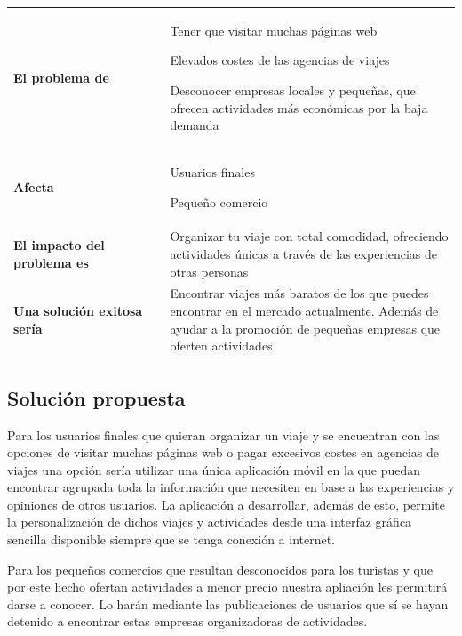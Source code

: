 \documentclass[11pt]{article}
\begin{document}
\begin{table}[H]
  \centering
  \begin{tabular}{p{0.35\linewidth}|p{0.65\linewidth}}
    \toprule
    \textbf{El problema de} & Tener que visitar muchas páginas web
    
    Elevados costes de las agencias de viajes
    
    Desconocer empresas locales y pequeñas, que ofrecen actividades más económicas por la baja demanda\\
    \textbf{Afecta} & Usuarios finales 
    
    Pequeño comercio\\
    \textbf{El impacto del problema es} & Organizar tu viaje con total comodidad, ofreciendo actividades únicas a través de las experiencias de otras personas\\
    \textbf{Una solución exitosa sería} & Encontrar viajes más baratos de los que puedes encontrar en el mercado actualmente. Además de ayudar a la promoción de pequeñas empresas que oferten actividades\\
    \bottomrule
  \end{tabular}
\end{table}

\subsection{Solución propuesta}
Para los usuarios finales que quieran organizar un viaje y se encuentran con las opciones de visitar muchas páginas web o pagar excesivos costes en agencias de viajes una opción sería utilizar una única aplicación móvil en la que puedan encontrar agrupada toda la información que necesiten en base a las experiencias y opiniones de otros usuarios. La aplicación a desarrollar, además de esto, permite la personalización de dichos viajes y actividades desde una interfaz gráfica sencilla disponible siempre que se tenga conexión a internet.

Para los pequeños comercios que resultan desconocidos para los turistas y que por este hecho ofertan actividades a menor precio nuestra apliación les permitirá darse a conocer. Lo harán mediante las publicaciones de usuarios que sí se hayan detenido a encontrar estas empresas organizadoras de actividades.
\newpage

\end{document}
